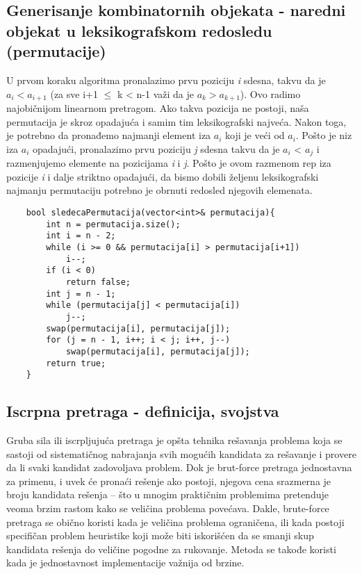 \documentclass{article}
\begin{document}
\subsection{Generisanje kombinatornih objekata - naredni objekat u leksikografskom redosledu (permutacije)}
U prvom koraku algoritma pronalazimo prvu poziciju \textit{i} sdesna, takvu
da je $a_i < a_{i+1}$ (za sve i+1 $\leq$ k < n-1 važi da je $a_k > a_{k+1}$). Ovo radimo
najobičnijom linearnom pretragom. Ako takva pozicija
ne postoji, naša permutacija je skroz opadajuća i samim tim leksikografski
najveća. Nakon toga, je potrebno da pronađemo najmanji element iza $a_i$ koji
je veći od $a_i$. Pošto je niz iza $a_i$ opadajući, pronalazimo prvu poziciju \textit{j} sdesna
takvu da je $a_i$ < $a_j$ i razmenjujemo elemente na
pozicijama \textit{i} i \textit{j}. Pošto je ovom razmenom rep iza pozicije \textit{i} i dalje striktno opadajući,
da bismo dobili željenu leksikografski najmanju permutaciju potrebno je obrnuti redosled njegovih elemenata.
\begin{lstlisting}
    bool sledecaPermutacija(vector<int>& permutacija){
        int n = permutacija.size();
        int i = n - 2;
        while (i >= 0 && permutacija[i] > permutacija[i+1])
            i--;
        if (i < 0) 
            return false;
        int j = n - 1;
        while (permutacija[j] < permutacija[i])
            j--;
        swap(permutacija[i], permutacija[j]);
        for (j = n - 1, i++; i < j; i++, j--)
            swap(permutacija[i], permutacija[j]);
        return true;
    }
\end{lstlisting}

\subsection{Iscrpna pretraga - definicija, svojstva}
Gruba sila ili iscrpljujuća pretraga je opšta tehnika rešavanja problema koja se sastoji od sistematičnog nabrajanja svih mogućih kandidata za rešavanje i provere da li svaki kandidat zadovoljava problem.
Dok je brut-force pretraga jednostavna za primenu, i uvek će pronaći rešenje ako postoji, njegova cena srazmerna je broju kandidata rešenja – što u
mnogim praktičnim problemima pretenduje veoma brzim rastom kako se veličina
problema povećava. Dakle, brute-force pretraga se obično koristi kada je
veličina problema ograničena, ili kada postoji specifičan problem heuristike
koji može biti iskorišćen da se smanji skup kandidata rešenja do veličine pogodne za rukovanje. Metoda se takođe koristi kada je jednostavnost implementacije važnija od brzine.
\end{document}
